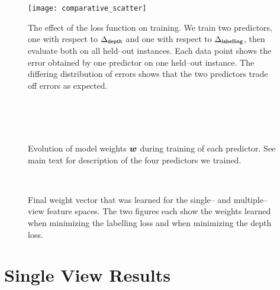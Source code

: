 \begin{figure}[tb]%
  \centering
  \texttt{[image: comparative\_scatter]}
  \caption{The effect of the loss function on training. We train two
    predictors, one with respect to $\DepthLoss$ and one with respect
    to $\LblLoss$, then evaluate both on all held--out instances. Each
    data point shows the error obtained by one predictor on one held--out
    instance. The differing distribution of errors shows that the two
    predictors trade off errors as expected.}
  \label{fig:comparative-scatter}
\end{figure}

\begin{figure}[tb]
  \centering
  \\
  \\
  \\
  \caption{Evolution of model weights $\Model$ during training of each
    predictor. See main text for description of the four predictors we
    trained.}
  \label{fig:psi-evolution}
\end{figure}

\begin{figure}[tb]
  \centering
  \\
  \caption{Final weight vector that was learned for the single-- and
    multiple--view feature spaces. The two figures each show the
    weights learned when minimizing the labelling loss and when
    minimizing the depth loss.}
  \label{fig:learned-weights}
\end{figure}

\section{Single View Results}
\label{sec:sv-results}

